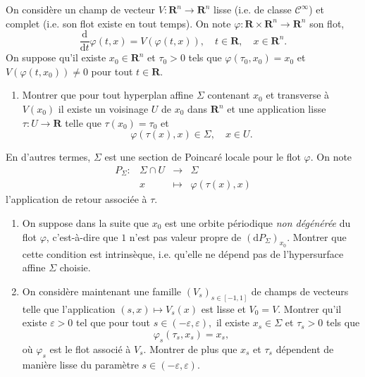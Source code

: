 \documentclass[a4paper,10pt,openany]{article}
\theoremstyle{plain}
\theoremstyle{definition}
\newcommand{\dd}{\mathrm{d}}
\newcommand{\R}{\mathbf{R}}
\begin{document}
\noindent On consid\`ere un champ de vecteur $V : \R^n \to \R^n$ lisse (i.e. de classe $\mathcal{C}^\infty$) et complet (i.e. son flot existe en tout temps). On note $\varphi : \R \times \R^n \to \R^n$ son flot,
$$
\frac{\dd}{\dd t} \varphi(t,x) = V(\varphi(t,x)), \quad t \in \R, \quad x \in \R^n.
$$
On suppose qu'il existe $x_0 \in \R^n$ et $\tau_0 > 0$ tels que $\varphi(\tau_0, x_0) = x_0$ et $V(\varphi(t,x_0)) \neq 0$ pour tout $t \in \R$. 
\begin{enumerate}
\item Montrer que pour tout hyperplan affine $\Sigma$ contenant $x_0$ et transverse \`a $V(x_0)$ il existe un voisinage $U$ de $x_0$ dans $\R^n$ et une application lisse $\tau : U \to \R$ telle que $\tau(x_0) = \tau_0$ et
$$
\varphi(\tau(x), x) \in \Sigma, \quad x \in U.
$$ 
\end{enumerate}
En d'autres termes, $\Sigma$ est une section de Poincar\'e locale pour le flot $\varphi$. On note
$$
\begin{matrix}
P_\Sigma : &\Sigma \cap U &\to &\Sigma \\
&x &\mapsto &\varphi(\tau(x), x)
\end{matrix}
$$
l'application de retour associ\'ee \`a $\tau$. 
\begin{enumerate}[resume]
\item On suppose dans la suite que $x_0$ est une orbite p\'eriodique \textit{non d\'eg\'en\'er\'ee} du flot $\varphi$, c'est-\`a-dire que $1$ n'est pas valeur propre de $(\dd P_\Sigma)_{x_0}.$ Montrer que cette condition est intrins\`eque, i.e. qu'elle ne d\'epend pas de l'hypersurface affine $\Sigma$ choisie. 
\item On consid\`ere maintenant une famille $(V_s)_{s \in [-1,1]}$ de champs de vecteurs telle que l'application $(s, x) \mapsto V_s(x)$ est lisse et $V_0 = V$. Montrer qu'il existe $\varepsilon > 0$ tel que pour tout $s \in (-\varepsilon, \varepsilon),$ il existe $x_s \in \Sigma$ et $\tau_s > 0$ tels que 
$$
\varphi_s(\tau_s, x_s) = x_s,
$$
o\`u $\varphi_s$ est le flot associ\'e \`a $V_s$. Montrer de plus que $x_s$ et $\tau_s$ d\'ependent de mani\`ere lisse du param\`etre $s \in (-\varepsilon, \varepsilon).$
\end{enumerate}

\hfill \break 

 \\ 
\end{document}
